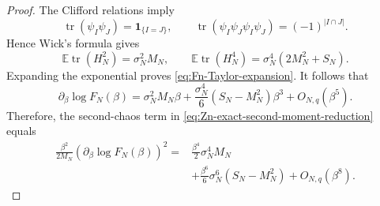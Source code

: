 \documentclass[11pt]{article}
\newcommand{\E}{\mathbb{E}}
\newcommand{\ind}{\mathbf{1}}
\DeclareMathOperator{\tr}{tr}
\begin{document}
\begin{proof}
  The Clifford relations imply
  \begin{equation}\label{eq:Clifford-two-four-traces}
    \tr(\psi_I\psi_J)
    =
    \ind_{\{I=J\}},
    \qquad
    \tr(\psi_I\psi_J\psi_I\psi_J)
    =
    (-1)^{|I\cap J|}.
  \end{equation}
  Hence Wick's formula gives
  \begin{equation}\label{eq:H2-H4-annealed}
    \E\tr(H_N^2)
    =
    \sigma_N^2M_N,
    \qquad
    \E\tr(H_N^4)
    =
    \sigma_N^4
    \left(
      2M_N^2+S_N
    \right).
  \end{equation}
  Expanding the exponential proves \eqref{eq:Fn-Taylor-expansion}.
  It follows that
  \begin{equation}\label{eq:log-Fn-derivative-Taylor}
    \partial_\beta\log F_N(\beta)
    =
    \sigma_N^2M_N\beta
    +
    \frac{\sigma_N^4}{6}
    \left(
      S_N-M_N^2
    \right)\beta^3
    +
    O_{N,q}(\beta^5).
  \end{equation}
  Therefore, the second-chaos term in
  \eqref{eq:Zn-exact-second-moment-reduction} equals
  \begin{equation}\label{eq:Zn-second-chaos-Taylor}
    \begin{aligned}
      \frac{\beta^2}{2M_N}
      \left(
        \partial_\beta\log F_N(\beta)
      \right)^2
      ={}&
      \frac{\beta^4}{2}\sigma_N^4M_N
      \\
      &+
      \frac{\beta^6}{6}\sigma_N^6
      \left(
        S_N-M_N^2
      \right)
      +
      O_{N,q}(\beta^8).
    \end{aligned}
  \end{equation}


\end{proof}
\end{document}
